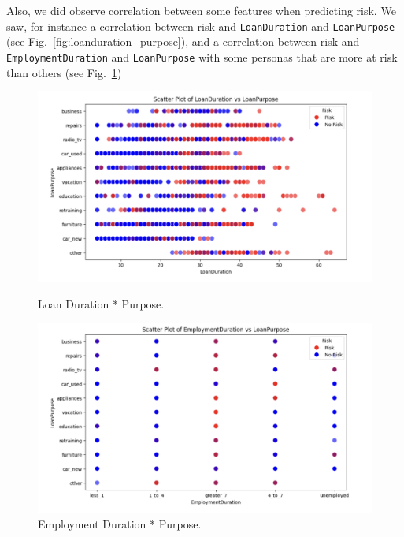 \documentclass[12pt]{report}
\begin{document}
Also, we did observe correlation between some features when predicting risk. We saw, for instance a correlation between risk and \texttt{LoanDuration} and \texttt{LoanPurpose} (see Fig.~\ref{fig:loanduration_purpose}), and a correlation between risk and \texttt{EmploymentDuration} and \texttt{LoanPurpose} with some personas that are more at risk than others (see Fig.~\ref{fig:employmentduration_purpose})

\begin{figure}[htbp]
    \centering
    \begin{minipage}[t]{0.45\textwidth}
        \centering
        \includegraphics[width=\textwidth]{loanduration_purpose.png}
        \caption{Loan Duration * Purpose.}
        \label{fig:loanduration_purpose}
    \end{minipage}
    \hfill
    \begin{minipage}[t]{0.45\textwidth}
        \centering
        \includegraphics[width=\textwidth]{employmentduration_purpose.png}
        \caption{Employment Duration * Purpose.}
        \label{fig:employmentduration_purpose}
    \end{minipage}
\end{figure}
\end{document}
